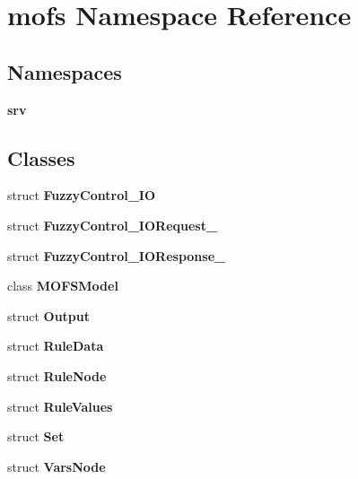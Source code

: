 \section{mofs Namespace Reference}
\label{namespacemofs}
\subsection*{Namespaces}
\begin{DoxyCompactItemize}
\item 
{\bf srv}
\end{DoxyCompactItemize}
\subsection*{Classes}
\begin{DoxyCompactItemize}
\item 
struct {\bf Fuzzy\-Control\-\_\-\-I\-O}
\item 
struct {\bf Fuzzy\-Control\-\_\-\-I\-O\-Request\-\_\-}
\item 
struct {\bf Fuzzy\-Control\-\_\-\-I\-O\-Response\-\_\-}
\item 
class {\bf M\-O\-F\-S\-Model}
\item 
struct {\bf Output}
\item 
struct {\bf Rule\-Data}
\item 
struct {\bf Rule\-Node}
\item 
struct {\bf Rule\-Values}
\item 
struct {\bf Set}
\item 
struct {\bf Vars\-Node}
\end{DoxyCompactItemize}
